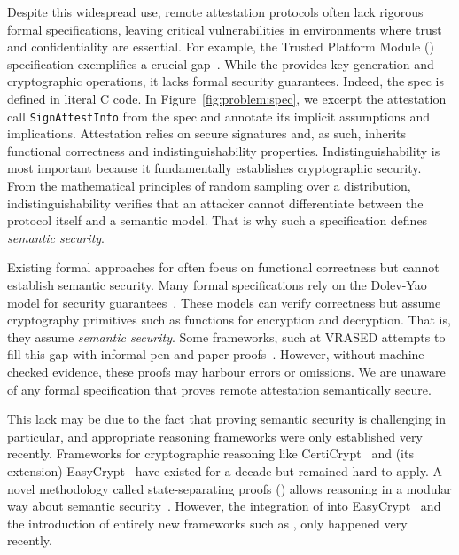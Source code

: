 %
Despite this widespread use, remote attestation protocols
often lack rigorous formal specifications, leaving critical
vulnerabilities in environments where trust and confidentiality
are essential.
%
For example, the Trusted Platform Module (\tpm) specification
exemplifies a crucial gap~\cite{tpm-spec}.
%
While the \tpm provides key generation and cryptographic
operations, it lacks formal security guarantees.
%
Indeed, the \tpm spec is defined in literal C code.
%
In Figure~\ref{fig:problem:spec}, we excerpt the attestation
call \texttt{SignAttestInfo} from the spec and annotate
its implicit assumptions and implications.
%
Attestation relies on secure signatures and, as such, 
inherits functional correctness and indistinguishability properties. 
%
Indistinguishability is most important because it fundamentally establishes cryptographic security.
%
From the mathematical principles of random sampling over a
distribution, indistinguishability verifies that an attacker
cannot differentiate between the protocol itself and a semantic
model.
%
That is why such a specification defines \emph{semantic security}.
%


%
Existing formal approaches for \ra often focus on functional
correctness but cannot establish semantic security.
%
Many formal \ra specifications rely on the Dolev-Yao model
for security guarantees~\cite{pornin2005digital, tamarin}.
%
These models can verify correctness but assume cryptography
primitives such as functions for encryption and decryption.
%
That is, they assume \emph{semantic security}.
%
Some frameworks, such at VRASED attempts to
fill this gap with informal pen-and-paper proofs~\cite{vrased}.
%
However, without machine-checked evidence, these proofs may harbour
errors or omissions.
%
We are unaware of any formal specification that proves remote
attestation semantically secure.
%

%
This lack may be due to the fact that proving semantic security
is challenging in particular, and appropriate reasoning frameworks
were only established very recently.
%
Frameworks for cryptographic reasoning like CertiCrypt~\cite{barthe2009formal}
and (its extension) EasyCrypt~\cite{barthe2012easycrypt}
have existed for a decade but remained hard to apply.
%
A novel methodology called state-separating proofs (\ssp) allows
reasoning in a modular way about semantic security~\cite{ssp}.
%
However, the integration of \ssp into EasyCrypt~\cite{9919671} and
the introduction of entirely new  frameworks such as
, only happened very recently.
%


